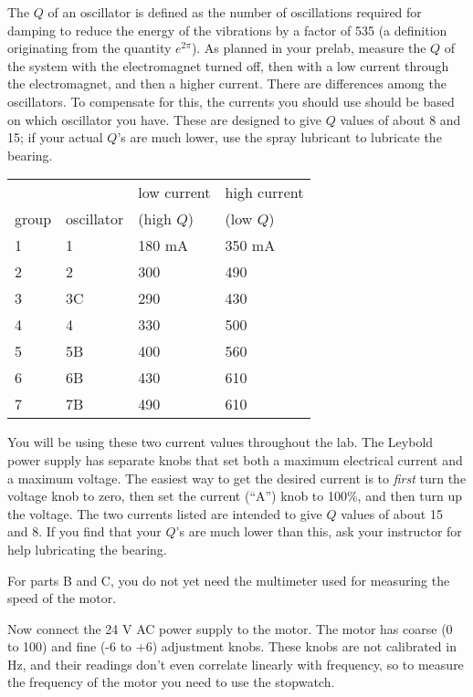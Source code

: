 The $Q$ of an oscillator is defined as the number of
oscillations required for damping to reduce the energy of
the vibrations by a factor of 535 (a definition originating
from the quantity $e^{2\pi}$). As planned in your prelab,
measure the $Q$ of the system with the electromagnet turned
off, then with a low current through the electromagnet,
and then a higher current. There are differences among the oscillators.
To compensate for this,
the currents you should use should be based on which oscillator you have. 
These are designed to give $Q$ values of about 8 and 15; if your actual
$Q$'s are much lower, use the spray lubricant to lubricate the bearing.

\begin{tabular}{llll}
      &              & low current & high current \\
group & oscillator   & (high $Q$)  &    (low $Q$)\\
1     &      1       &   180  mA   &    350 mA \\
2     &      2       &   300       &    490  \\
3     &      3C      &   290       &    430 \\
4     &      4       &   330       &    500  \\
5     &      5B      &   400       &    560 \\
6     &      6B      &   430       &    610  \\
7     &      7B      &   490       &    610  
\end{tabular}

You will be using these two current
values throughout the lab.
The Leybold power supply has separate knobs that set both a maximum electrical
current and a maximum voltage. The easiest way to get the desired current is to
\emph{first} turn the voltage knob to zero, then set the current (``A'') knob
to 100\%, and then turn up the voltage. The two currents listed are intended
to give $Q$ values of about 15 and 8. If you find that your $Q$'s are much
lower than this, ask your instructor for help lubricating the bearing.

For parts B and C, you do not yet need the multimeter used for measuring the speed of the motor.


Now connect the 24 V AC power supply to the motor.
The motor has coarse (0 to 100) and fine (-6 to +6) adjustment knobs.
These knobs are not
calibrated in Hz, and their readings don't even correlate linearly with
frequency, so to measure the frequency of the motor you need to use the stopwatch.


